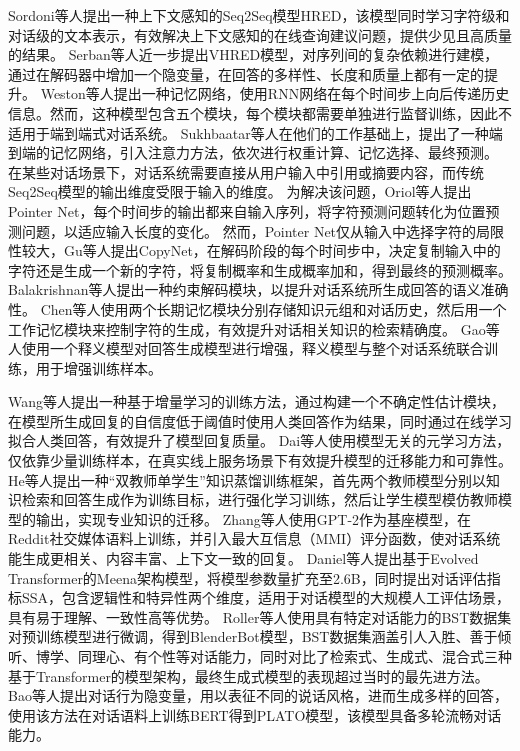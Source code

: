 Sordoni等人\cite{DBLP:conf/cikm/SordoniBVLSN15}提出一种上下文感知的Seq2Seq模型HRED，该模型同时学习字符级和对话级的文本表示，有效解决上下文感知的在线查询建议问题，提供少见且高质量的结果。
Serban等人\cite{DBLP:conf/aaai/SerbanSLCPCB17}近一步提出VHRED模型，对序列间的复杂依赖进行建模，通过在解码器中增加一个隐变量，在回答的多样性、长度和质量上都有一定的提升。
Weston等人\cite{DBLP:journals/corr/WestonCB14}提出一种记忆网络，使用RNN网络在每个时间步上向后传递历史信息。然而，这种模型包含五个模块，每个模块都需要单独进行监督训练，因此不适用于端到端式对话系统。
Sukhbaatar等人\cite{DBLP:conf/nips/SukhbaatarSWF15}在他们的工作基础上，提出了一种端到端的记忆网络，引入注意力方法，依次进行权重计算、记忆选择、最终预测。
在某些对话场景下，对话系统需要直接从用户输入中引用或摘要内容，而传统Seq2Seq模型的输出维度受限于输入的维度。
为解决该问题，Oriol等人\cite{DBLP:conf/nips/VinyalsFJ15}提出Pointer Net，每个时间步的输出都来自输入序列，将字符预测问题转化为位置预测问题，以适应输入长度的变化。
然而，Pointer Net仅从输入中选择字符的局限性较大，Gu等人\cite{DBLP:conf/acl/GuLLL16}提出CopyNet，在解码阶段的每个时间步中，决定复制输入中的字符还是生成一个新的字符，将复制概率和生成概率加和，得到最终的预测概率。
Balakrishnan等人\cite{DBLP:conf/acl/BalakrishnanRUW19}提出一种约束解码模块，以提升对话系统所生成回答的语义准确性。
Chen等人\cite{DBLP:conf/acl/ChenXX19}使用两个长期记忆模块分别存储知识元组和对话历史，然后用一个工作记忆模块来控制字符的生成，有效提升对话相关知识的检索精确度。
Gao等人\cite{DBLP:conf/acl/GaoZOY20}使用一个释义模型对回答生成模型进行增强，释义模型与整个对话系统联合训练，用于增强训练样本。

Wang等人\cite{DBLP:conf/acl/WangZLHZL19}提出一种基于增量学习的训练方法，通过构建一个不确定性估计模块，在模型所生成回复的自信度低于阈值时使用人类回答作为结果，同时通过在线学习拟合人类回答，有效提升了模型回复质量。
Dai等人\cite{DBLP:conf/acl/DaiLTLSZ20}使用模型无关的元学习方法，仅依靠少量训练样本，在真实线上服务场景下有效提升模型的迁移能力和可靠性。
He等人\cite{DBLP:conf/emnlp/HeYYLSX20}提出一种“双教师单学生”知识蒸馏训练框架，首先两个教师模型分别以知识检索和回答生成作为训练目标，进行强化学习训练，然后让学生模型模仿教师模型的输出，实现专业知识的迁移。
Zhang等人\cite{DBLP:conf/acl/ZhangSGCBGGLD20}使用GPT-2\cite{radford2019language}作为基座模型，在Reddit社交媒体语料上训练，并引入最大互信息（MMI）评分函数，使对话系统能生成更相关、内容丰富、上下文一致的回复。
Daniel等人\cite{DBLP:journals/corr/abs-2001-09977}提出基于Evolved Transformer的Meena架构模型，将模型参数量扩充至2.6B，同时提出对话评估指标SSA，包含逻辑性和特异性两个维度，适用于对话模型的大规模人工评估场景，具有易于理解、一致性高等优势。
Roller等人\cite{DBLP:conf/eacl/RollerDGJWLXOSB21}使用具有特定对话能力的BST数据集对预训练模型进行微调，得到BlenderBot模型，BST数据集涵盖引人入胜、善于倾听、博学、同理心、有个性等对话能力，同时对比了检索式、生成式、混合式三种基于Transformer的模型架构，最终生成式模型的表现超过当时的最先进方法。
Bao等人\cite{DBLP:conf/acl/BaoHWWW20}提出对话行为隐变量，用以表征不同的说话风格，进而生成多样的回答，使用该方法在对话语料上训练BERT得到PLATO模型，该模型具备多轮流畅对话能力。

